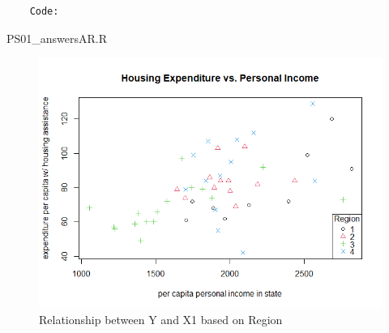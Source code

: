 \documentclass[12pt,letterpaper]{article}
\begin{document}
\begin{itemize}
\begin{Verbatim}
	Code:
 \end{Verbatim}
	 {PS01_answersAR.R}
\begin{figure}[h!]\centering
		\caption{\footnotesize Relationship between Y and X1 based on Region}
		\label{fig:plot_3}
		\includegraphics[width=.85\textwidth]{yx1_byregion.png}
\end{figure}
\end{itemize}
\end{document}
